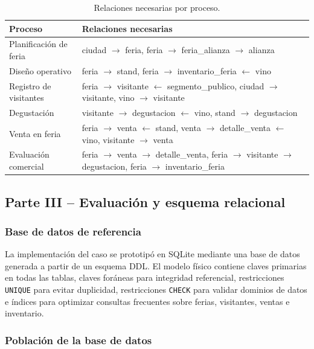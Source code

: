 \documentclass[10pt,a4paper]{article}
\begin{document}
\begin{table}[H]
\centering
\caption{Relaciones necesarias por proceso.}
\label{tab:relaciones}
\small
\begin{tabular}{p{3.5cm} p{10cm}}
\toprule
\textbf{Proceso} & \textbf{Relaciones necesarias} \\
\midrule
Planificaci\'on de feria & ciudad $\rightarrow$ feria, feria $\rightarrow$ feria\_alianza $\rightarrow$ alianza \\
Dise\~no operativo & feria $\rightarrow$ stand, feria $\rightarrow$ inventario\_feria $\leftarrow$ vino \\
Registro de visitantes & feria $\rightarrow$ visitante $\leftarrow$ segmento\_publico, ciudad $\rightarrow$ visitante, vino $\rightarrow$ visitante \\
Degustaci\'on & visitante $\rightarrow$ degustacion $\leftarrow$ vino, stand $\rightarrow$ degustacion \\
Venta en feria & feria $\rightarrow$ venta $\leftarrow$ stand, venta $\rightarrow$ detalle\_venta $\leftarrow$ vino, visitante $\rightarrow$ venta \\
Evaluaci\'on comercial & feria $\rightarrow$ venta $\rightarrow$ detalle\_venta, feria $\rightarrow$ visitante $\rightarrow$ degustacion, feria $\rightarrow$ inventario\_feria \\
\bottomrule
\end{tabular}
\end{table}

\subsection{Parte III -- Evaluaci\'on y esquema relacional}

\subsubsection{Base de datos de referencia}

La implementaci\'on del caso se prototip\'o en SQLite mediante una base de datos generada a partir de un esquema DDL. El modelo f\'isico contiene claves primarias en todas las tablas, claves for\'aneas para integridad referencial, restricciones \texttt{UNIQUE} para evitar duplicidad, restricciones \texttt{CHECK} para validar dominios de datos e \'indices para optimizar consultas frecuentes sobre ferias, visitantes, ventas e inventario.

\subsubsection{Poblaci\'on de la base de datos}
\end{document}
